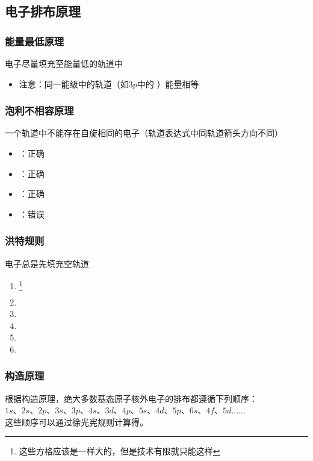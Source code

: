 \documentclass[a4paper]{article}
\begin{document}
	\subsection{电子排布原理}
	\subsubsection{能量最低原理}
	电子尽量填充至能量低的轨道中
	\begin{itemize}
		\item 注意：同一能级中的轨道（如$3p$中的 \fbox{$\ \ $}\fbox{$\ \ $}\fbox{$\ \ $} ）能量相等
	\end{itemize}
	\subsubsection{泡利不相容原理}
	一个轨道中不能存在自旋相同的电子（轨道表达式中同轨道箭头方向不同）
	\begin{itemize}
		\item \fbox{$\uparrow\ $}：正确
		\item \fbox{$\ \downarrow$}：正确
		\item \fbox{$\uparrow\downarrow$}：正确
		\item \fbox{$\uparrow\uparrow$}：错误
	\end{itemize}
	\subsubsection{洪特规则}
	电子总是先填充空轨道
	\begin{enumerate}
		\item \fbox{$\uparrow\ $}\fbox{$\ \ $}\fbox{$\ \ $}\footnote{这些方格应该是一样大的，但是技术有限就只能这样}
		\item \fbox{$\uparrow\ $}\fbox{$\uparrow\ $}\fbox{$\ \ $}
		\item \fbox{$\uparrow\ $}\fbox{$\uparrow\ $}\fbox{$\uparrow\ $}
		\item \fbox{$\uparrow\downarrow$}\fbox{$\uparrow\ $}\fbox{$\uparrow\ $}
		\item \fbox{$\uparrow\downarrow$}\fbox{$\uparrow\downarrow$}\fbox{$\uparrow\ $}
		\item \fbox{$\uparrow\downarrow$}\fbox{$\uparrow\downarrow$}\fbox{$\uparrow\downarrow$}
	\end{enumerate}
	\subsubsection{构造原理}
	根据构造原理，绝大多数基态原子核外电子的排布都遵循下列顺序：\\
	$1s$、$2s$、$2p$、$3s$、$3p$、$4s$、$3d$、$4p$、$5s$、$4d$、$5p$、$6s$、$4f$、$5d$......\\
	这些顺序可以通过徐光宪规则计算得。
	
\end{document}
